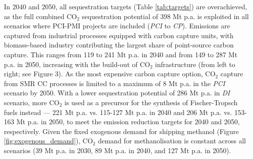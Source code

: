 \documentclass[pdflatex,sn-nature]{sn-jnl}
\theoremstyle{thmstyleone}%
\theoremstyle{thmstyletwo}%
\theoremstyle{thmstylethree}%
\begin{document}
In 2040 and 2050, all sequestration targets (Table \ref{tab:targets}) are overachieved, as the full combined CO$_2$ sequestration potential of 398 Mt p.a. is exploited in all scenarios where PCI-PMI projects are included (\textit{PCI} to \textit{CP}).  Emissions are captured from industrial processes equipped with carbon capture units, with biomass-based industry contributing the largest share of point-source carbon capture. This ranges from 119 to 241 Mt p.a. in 2040 and from 149 to 287 Mt p.a. in 2050, increasing with the build-out of CO$_2$ infrastructure (from left to right; see Figure 3). As the most expensive carbon capture option, CO$_2$ capture from SMR CC processes is limited to a maximum of 8 Mt p.a. in the \textit{PCI} scenario by 2050.
With a lower sequestration potential of 286 Mt p.a. in \textit{DI} scenario, more CO$_2$ is used as a precursor for the synthesis of Fischer-Tropsch fuels instead --- 221 Mt p.a. vs. 115-127 Mt p.a. in 2040 and 206 Mt p.a. vs. 153-163 Mt p.a. in 2050, to meet the emission reduction targets for 2040 and 2050, respectively. 
Given the fixed exogenous demand for shipping methanol (Figure \ref{fig:exogenous_demand}), CO$_2$ demand for methanolisation is constant across all scenarios (39 Mt p.a. in 2030, 89 Mt p.a. in 2040, and 127 Mt p.a. in 2050). 
\end{document}
